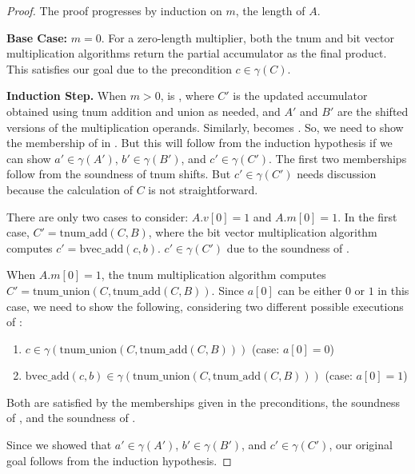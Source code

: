 \documentclass{article}
\newcommand{\basecase}[1]{\textbf{Base Case:} #1}
\newcommand{\inductionStep}{\textbf{Induction Step.}}
\newcommand{\lsb}[1]{#1[0]}
\newcommand{\tv}[1]{#1.v}
\newcommand{\tm}[1]{#1.m}
\newcommand{\ingamma}[2]{#1 \in \gamma(#2)}
\begin{document}
\begin{proof}
  The proof progresses by induction on $m$, the length of $A$.

  \basecase{$m = 0.$} For a zero-length multiplier, both the tnum and
  bit vector multiplication algorithms return the partial accumulator
  as the final product. This satisfies our goal due to the
  precondition $\ingamma{c}{C}$.

  \inductionStep{} When $m > 0$, \tmulshrABC{} is \tmulshrABCp{},
  where $C'$ is the updated accumulator obtained using tnum addition
  and union as needed, and $A'$ and $B'$ are the shifted versions of
  the multiplication operands. Similarly, \bmulshrABC{} becomes
  \bmulshrABCp{}. So, we need to show the membership of \bmulshrABCp{}
  in \tmulshrABCp{}. But this will follow from the induction
  hypothesis if we can show $\ingamma{a'}{A'}$, $\ingamma{b'}{B'}$,
  and $\ingamma{c'}{C'}$. The first two memberships follow from the
  soundness of tnum shifts. But $\ingamma{c'}{C'}$ needs discussion
  because the calculation of $C$ is not straightforward.
  
  There are only two cases to consider: $\lsb{\tv{A}}
  = 1$ and $\lsb{\tm{A}} = 1$.
  In the first case, $C' = \text{tnum\_add}(C, B)$, where the bit
  vector multiplication algorithm computes $c' = \text{bvec\_add}(c,
  b)$. $\ingamma{c'}{C'}$ due to the soundness of
  .

  \newcommand{\newCforMu}{\text{tnum\_union}(C, \text{tnum\_add}(C, B))}
  
  When $\lsb{\tm{A}} = 1$, the tnum multiplication algorithm computes
  $C' = \newCforMu{}$. Since $\lsb{a}$ can be either $0$ or $1$ in
  this case, we need to show the following, considering two different
  possible executions of \bmulshrId{}:

  \begin{enumerate}
  \item $\ingamma{c}{\newCforMu{}}$ (case: $\lsb{a} = 0$)
  \item $\ingamma{\text{bvec\_add}(c, b)}{\newCforMu{}}$ (case:
    $\lsb{a} = 1$)
  \end{enumerate}

  Both are satisfied by the memberships given in the preconditions,
  the soundness of , and the soundness of
  .

  Since we showed that $\ingamma{a'}{A'}$, $\ingamma{b'}{B'}$, and
  $\ingamma{c'}{C'}$, our original goal follows from the induction
  hypothesis.
\end{proof}
\end{document}

